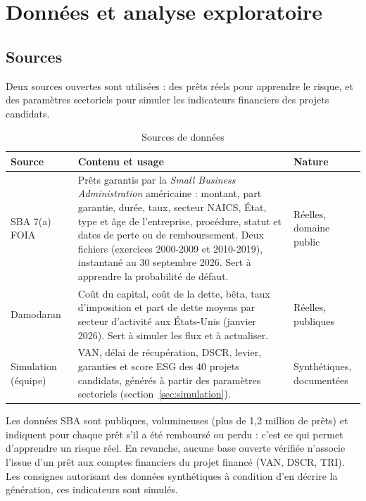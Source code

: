 \chapter{Données et analyse exploratoire}\label{chap:donnees}

\section{Sources}

Deux sources ouvertes sont utilisées : des prêts réels pour apprendre le risque, et des paramètres sectoriels pour
simuler les indicateurs financiers des projets candidats.

\begin{table}[htbp]
\centering\small
\caption{Sources de données}\label{tab:sources}
\begin{tabularx}{\textwidth}{>{\raggedright\arraybackslash}p{3.2cm}X>{\raggedright\arraybackslash}p{2.4cm}}
\toprule
Source & Contenu et usage & Nature \\
\midrule
SBA 7(a) FOIA~\cite{sba2026} & Prêts garantis par la \textit{Small Business Administration} américaine : montant, part
garantie, durée, taux, secteur NAICS, État, type et âge de l'entreprise, procédure, statut et dates de perte ou de
remboursement. Deux fichiers (exercices 2000-2009 et 2010-2019), instantané au 30 septembre 2026. Sert à apprendre
la probabilité de défaut. & Réelles, domaine public \\
Damodaran~\cite{damodaran2026} & Coût du capital, coût de la dette, bêta, taux d'imposition et part de dette moyens
par secteur d'activité aux États-Unis (janvier 2026). Sert à simuler les flux et à actualiser. & Réelles, publiques \\
Simulation (équipe) & VAN, délai de récupération, DSCR, levier, garanties et score ESG des 40 projets candidats,
générés à partir des paramètres sectoriels (section~\ref{sec:simulation}). & Synthétiques, documentées \\
\bottomrule
\end{tabularx}
\end{table}

Les données SBA sont publiques, volumineuses (plus de 1,2 million de prêts) et indiquent pour chaque prêt s'il a été
remboursé ou perdu : c'est ce qui permet d'apprendre un risque réel. En revanche, aucune base ouverte vérifiée n'associe
l'issue d'un prêt aux comptes financiers du projet financé (VAN, DSCR, TRI). Les consignes autorisant des données
synthétiques à condition d'en décrire la génération, ces indicateurs sont simulés.

